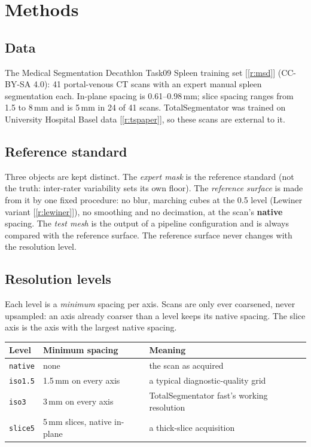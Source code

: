 \documentclass[10pt,a4paper]{article}
\newcommand{\lvl}[1]{\texttt{#1}}
\newcommand{\rf}[1]{[\ref{#1}]}
\begin{document}
\section{Methods}

\subsection{Data}
The Medical Segmentation Decathlon Task09 Spleen training set \rf{r:msd} (CC-BY-SA 4.0): 41 portal-venous CT scans with an expert manual spleen segmentation each. In-plane spacing is 0.61--0.98\,mm; slice spacing ranges from 1.5 to 8\,mm and is 5\,mm in 24 of 41 scans. TotalSegmentator was trained on University Hospital Basel data \rf{r:tspaper}, so these scans are external to it.

\subsection{Reference standard}
Three objects are kept distinct. The \emph{expert mask} is the reference standard (not the truth: inter-rater variability sets its own floor). The \emph{reference surface} is made from it by one fixed procedure: no blur, marching cubes at the 0.5 level (Lewiner variant \rf{r:lewiner}), no smoothing and no decimation, at the scan's \textbf{native} spacing. The \emph{test mesh} is the output of a pipeline configuration and is always compared with the reference surface. The reference surface never changes with the resolution level.

\subsection{Resolution levels}
Each level is a \emph{minimum} spacing per axis. Scans are only ever coarsened, never upsampled: an axis already coarser than a level keeps its native spacing. The slice axis is the axis with the largest native spacing.

\begin{center}
\begin{tabular}{lll}
\toprule
Level & Minimum spacing & Meaning \\
\midrule
\lvl{native} & none & the scan as acquired \\
\lvl{iso1.5} & 1.5\,mm on every axis & a typical diagnostic-quality grid \\
\lvl{iso3} & 3\,mm on every axis & TotalSegmentator fast's working resolution \\
\lvl{slice5} & 5\,mm slices, native in-plane & a thick-slice acquisition \\
\bottomrule
\end{tabular}
\end{center}
\end{document}
